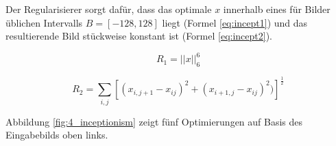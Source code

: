 Der Regularisierer sorgt dafür, dass das optimale $x$ innerhalb eines für Bilder üblichen Intervalls $B = [-128,128]$ liegt (Formel \ref{eq:incept1}) und das resultierende Bild stückweise konstant ist (Formel \ref{eq:incept2}).

\begin{equation}
\label{eq:incept1}
R_1 = ||x||^6_6
\end{equation}

\begin{equation}
\label{eq:incept2}
R_2 = \sum_{i,j}^{} [(x_{i,j+1} - x_{ij})^2 + (x_{i+1,j} - x_{ij})^2)]^{\frac{1}{2}}
\end{equation}


Abbildung \ref{fig:4_inceptionism} zeigt fünf Optimierungen auf Basis des Eingabebilds oben links.


